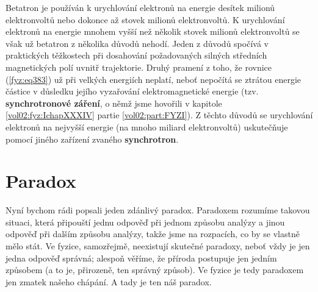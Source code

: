   Betatron je používán k urychlování elektronů na energie desítek milionů elektronvoltů nebo 
  dokonce až stovek milionů elektronvoltů. K urychlování elektronů na energie mnohem vyšší než 
  několik stovek milionů elektronvoltů se však už betatron z několika důvodů nehodí. Jeden z důvodů 
  spočívá v praktických těžkostech při dosahování požadovaných silných středních magnetických polí 
  uvnitř trajektorie. Druhý pramení z toho, že rovnice (\ref{fyz:eq383}) už při velkých energiích 
  neplatí, neboť nepočítá se ztrátou energie částice v důsledku jejího vyzařování elektromagnetické 
  energie (tzv. \textbf{synchrotronové záření}, o němž jsme hovořili v kapitole \ref{vol02:fyz:IchapXXXIV} partie 
  \ref{vol02:part:FYZI}). Z těchto důvodů se urychlování elektronů na nejvyšší energie (na mnoho miliard 
  elektronvoltů) uskutečňuje pomocí jiného zařízení zvaného \textbf{synchrotron}.
  
\section{Paradox}\label{fyz:IIchapXVIIsecIV}
  Nyní bychom rádi popsali jeden zdánlivý paradox. Paradoxem rozumíme takovou situaci, která 
  připouští jednu odpověď při jednom způsobu analýzy a jinou odpověď při dalším způsobu analýzy, 
  takže jsme na rozpacích, co by se vlastně mělo stát. Ve fyzice, samozřejmě, neexistují skutečné 
  paradoxy, neboť vždy je jen jedna odpověď správná; alespoň věříme, že příroda postupuje jen 
  jedním způsobem (a to je, přirozeně, ten správný způsob). Ve fyzice je tedy paradoxem jen zmatek 
  našeho chápání. A tady je ten náš paradox.
  
